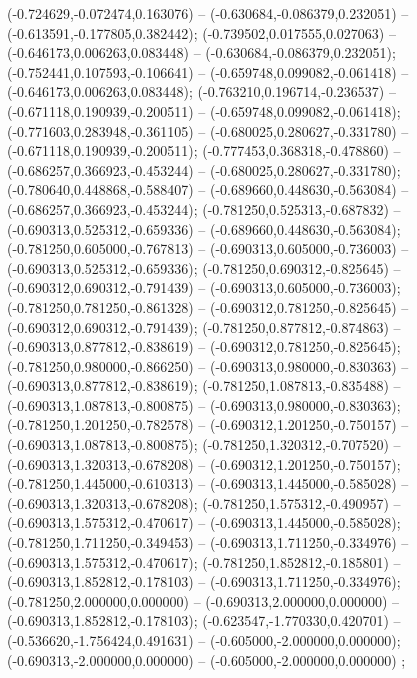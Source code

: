  (-0.724629,-0.072474,0.163076) -- (-0.630684,-0.086379,0.232051) -- (-0.613591,-0.177805,0.382442);
 (-0.739502,0.017555,0.027063) -- (-0.646173,0.006263,0.083448) -- (-0.630684,-0.086379,0.232051);
 (-0.752441,0.107593,-0.106641) -- (-0.659748,0.099082,-0.061418) -- (-0.646173,0.006263,0.083448);
 (-0.763210,0.196714,-0.236537) -- (-0.671118,0.190939,-0.200511) -- (-0.659748,0.099082,-0.061418);
 (-0.771603,0.283948,-0.361105) -- (-0.680025,0.280627,-0.331780) -- (-0.671118,0.190939,-0.200511);
 (-0.777453,0.368318,-0.478860) -- (-0.686257,0.366923,-0.453244) -- (-0.680025,0.280627,-0.331780);
 (-0.780640,0.448868,-0.588407) -- (-0.689660,0.448630,-0.563084) -- (-0.686257,0.366923,-0.453244);
 (-0.781250,0.525313,-0.687832) -- (-0.690313,0.525312,-0.659336) -- (-0.689660,0.448630,-0.563084);
 (-0.781250,0.605000,-0.767813) -- (-0.690313,0.605000,-0.736003) -- (-0.690313,0.525312,-0.659336);
 (-0.781250,0.690312,-0.825645) -- (-0.690312,0.690312,-0.791439) -- (-0.690313,0.605000,-0.736003);
 (-0.781250,0.781250,-0.861328) -- (-0.690312,0.781250,-0.825645) -- (-0.690312,0.690312,-0.791439);
 (-0.781250,0.877812,-0.874863) -- (-0.690313,0.877812,-0.838619) -- (-0.690312,0.781250,-0.825645);
 (-0.781250,0.980000,-0.866250) -- (-0.690313,0.980000,-0.830363) -- (-0.690313,0.877812,-0.838619);
 (-0.781250,1.087813,-0.835488) -- (-0.690313,1.087813,-0.800875) -- (-0.690313,0.980000,-0.830363);
 (-0.781250,1.201250,-0.782578) -- (-0.690312,1.201250,-0.750157) -- (-0.690313,1.087813,-0.800875);
 (-0.781250,1.320312,-0.707520) -- (-0.690313,1.320313,-0.678208) -- (-0.690312,1.201250,-0.750157);
 (-0.781250,1.445000,-0.610313) -- (-0.690313,1.445000,-0.585028) -- (-0.690313,1.320313,-0.678208);
 (-0.781250,1.575312,-0.490957) -- (-0.690313,1.575312,-0.470617) -- (-0.690313,1.445000,-0.585028);
 (-0.781250,1.711250,-0.349453) -- (-0.690313,1.711250,-0.334976) -- (-0.690313,1.575312,-0.470617);
 (-0.781250,1.852812,-0.185801) -- (-0.690313,1.852812,-0.178103) -- (-0.690313,1.711250,-0.334976);
 (-0.781250,2.000000,0.000000) -- (-0.690313,2.000000,0.000000) -- (-0.690313,1.852812,-0.178103);
 (-0.623547,-1.770330,0.420701) -- (-0.536620,-1.756424,0.491631) -- (-0.605000,-2.000000,0.000000);
 (-0.690313,-2.000000,0.000000) -- (-0.605000,-2.000000,0.000000) ;
